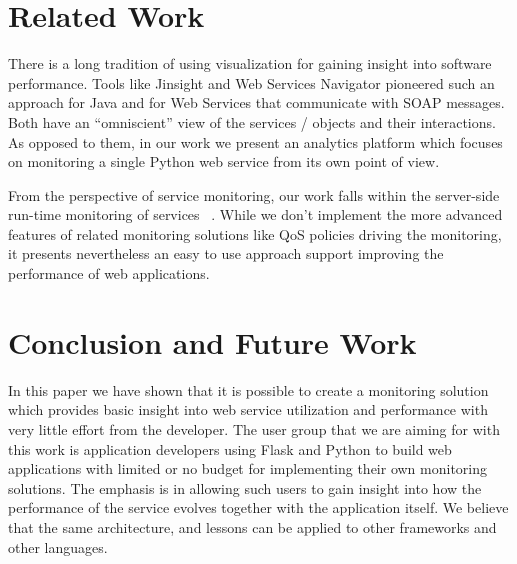 \documentclass{sig-alternate-05-2015}
\begin{document}
\section{Related Work}
\label{sec:related}


There is a long tradition of using visualization for gaining insight into software performance. Tools like Jinsight \cite{Pauw02a} and Web Services Navigator \cite{Pauw05} pioneered such an approach for Java and for Web Services that communicate with SOAP messages. Both have an ``omniscient'' view of the services / objects and their interactions. As opposed to them, in our work we present an analytics platform which focuses on monitoring a single Python web service from its own point of view.

From the perspective of service monitoring, our work falls within the server-side run-time monitoring of services ~\cite{ghezzi2007run}. While we don't implement the more advanced features of related monitoring solutions like QoS policies driving the monitoring, it presents nevertheless an easy to use approach support improving the performance of web applications. 




\section{Conclusion and Future Work}
\label{sec:conclusions}


In this paper we have shown that it is possible to create a monitoring solution which provides basic insight into web service utilization and performance  with very little effort from the developer. The user group that we are aiming for with this work is application developers using Flask and Python to build web applications with limited or no budget for implementing their own monitoring solutions. The emphasis is in allowing such users to gain insight into how the performance of the service evolves together with the application itself. We believe that the same architecture, and lessons can be applied to other frameworks and other languages.
\end{document}

